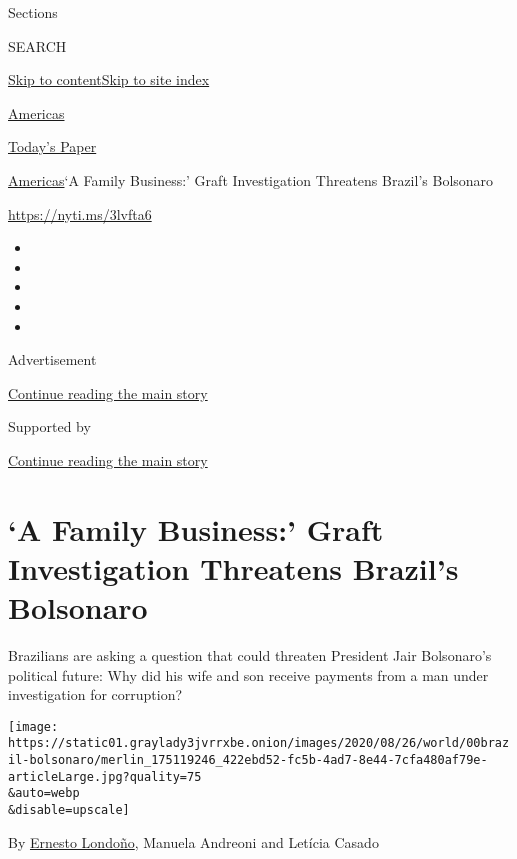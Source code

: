 Sections

SEARCH

\protect\hyperlink{site-content}{Skip to
content}\protect\hyperlink{site-index}{Skip to site index}

\href{https://www.nytimes3xbfgragh.onion/section/world/americas}{Americas}

\href{https://myaccount.nytimes3xbfgragh.onion/auth/login?response_type=cookie\&client_id=vi}{}

\href{https://www.nytimes3xbfgragh.onion/section/todayspaper}{Today's
Paper}

\href{/section/world/americas}{Americas}\textbar{}`A Family Business:'
Graft Investigation Threatens Brazil's Bolsonaro

\url{https://nyti.ms/3lvfta6}

\begin{itemize}
\item
\item
\item
\item
\item
\end{itemize}

Advertisement

\protect\hyperlink{after-top}{Continue reading the main story}

Supported by

\protect\hyperlink{after-sponsor}{Continue reading the main story}

\hypertarget{a-family-business-graft-investigation-threatens-brazils-bolsonaro}{%
\section{`A Family Business:' Graft Investigation Threatens Brazil's
Bolsonaro}\label{a-family-business-graft-investigation-threatens-brazils-bolsonaro}}

Brazilians are asking a question that could threaten President Jair
Bolsonaro's political future: Why did his wife and son receive payments
from a man under investigation for corruption?

\texttt{[image: https://static01.graylady3jvrrxbe.onion/images/2020/08/26/world/00brazil-bolsonaro/merlin\_175119246\_422ebd52-fc5b-4ad7-8e44-7cfa480af79e-articleLarge.jpg?quality=75\\\&auto=webp\\\&disable=upscale]}

By \href{https://www.nytimes3xbfgragh.onion/by/ernesto-londono}{Ernesto
Londoño}, Manuela Andreoni and Letícia Casado

